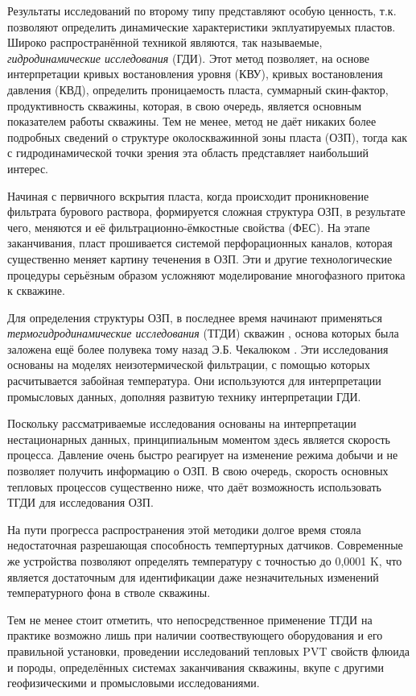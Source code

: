 	Результаты исследований по второму типу представляют особую ценность, т.к. позволяют определить динамические характеристики экплуатируемых пластов. 
	Широко распространённой техникой являются, так называемые, \textit{гидродинамические исследования} (ГДИ). 
	Этот метод позволяет, на основе интерпретации кривых востановления уровня (КВУ), кривых востановления давления (КВД), определить проницаемость пласта, суммарный  скин-фактор, продуктивность скважины, которая, в свою очередь, является основным показателем работы скважины.
	Тем не менее, метод не даёт никаких более подробных сведений о структуре околоскважинной зоны пласта (ОЗП), тогда как с гидродинамической точки зрения эта область представляет наибольший интерес.

	Начиная с первичного вскрытия пласта, когда происходит проникновение фильтрата бурового раствора, формируется сложная структура ОЗП, в результате чего, меняются и её фильтрационно-ёмкостные свойства (ФЕС). На этапе заканчивания, пласт прошивается системой перфорационных каналов, которая существенно меняет картину теченения в ОЗП. Эти и другие технологические процедуры серьёзным образом усложняют моделирование многофазного притока к скважине.
	
	Для определения структуры ОЗП, в последнее время начинают применяться \textit{термогидродинамические исследования} (ТГДИ) скважин \cite{ramazanov_diss,ramazanov_spe, ramazanov_spe1, posv}, основа которых была заложена ещё более полувека тому назад Э.Б. Чекалюком \cite{checkalyuk}.
	Эти исследования основаны на моделях неизотермической фильтрации, с помощью которых расчитывается забойная температура.
	Они используются для интерпретации промысловых данных, дополняя развитую технику интерпретации ГДИ.

	Поскольку рассматриваемые исследования основаны на интерпретации нестационарных данных, принципиальным моментом здесь является скорость процесса.
	Давление очень быстро реагирует на изменение режима добычи и не позволяет получить информацию о ОЗП.
	В свою очередь, скорость основных тепловых процессов существенно ниже, что даёт возможность использовать ТГДИ для исследования ОЗП.

	На пути прогресса распространения этой методики долгое время стояла недостаточная разрешающая способность темпертурных датчиков.
	Современные же устройства позволяют определять температуру с точностью до 0,0001 K, что является достаточным для идентификации даже незначительных изменений температурного фона в стволе скважины.

	Тем не менее стоит отметить, что непосредственное применение ТГДИ на практике возможно лишь при наличии соотвествующего оборудования и его правильной установки, проведении исследований тепловых PVT свойств флюида и породы, определённых системах заканчивания скважины, вкупе с другими геофизическими и промысловыми исследованиями.


